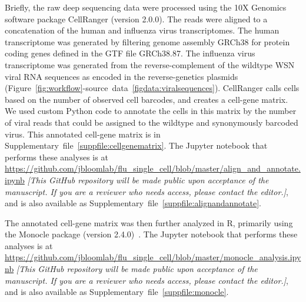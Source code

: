 \documentclass[9pt,lineno]{elife}
\newcommand{\jdbcomment}[1]{\emph{\color{red} [#1]}}
\begin{document}
Briefly, the raw deep sequencing data were processed using the 10X Genomics software package CellRanger (version 2.0.0).
The reads were aligned to a concatenation of the human and influenza virus transcriptomes.
The human transcriptome was generated by filtering genome assembly GRCh38 for protein coding genes defined in the GTF file GRCh38.87.
The influenza virus transcriptome was generated from the reverse-complement of the wildtype WSN viral RNA sequences as encoded in the reverse-genetics plasmids (Figure~\ref{fig:workflow}-source~data~\ref{figdata:viralsequences}).
CellRanger calls cells based on the number of observed cell barcodes, and creates a cell-gene matrix.
We used custom Python code to annotate the cells in this matrix by the number of viral reads that could be assigned to the wildtype and synonymously barcoded virus.
This annotated cell-gene matrix is in Supplementary~file~\ref{suppfile:cellgenematrix}.
The Jupyter notebook that performs these analyses is at \url{https://github.com/jbloomlab/flu_single_cell/blob/master/align_and_annotate.ipynb} \jdbcomment{This GitHub repository will be made public upon acceptance of the manuscript. If you are a reviewer who needs access, please contact the editor.}, and is also available as Supplementary~file~\ref{suppfile:alignandannotate}.

The annotated cell-gene matrix was then further analyzed in R, primarily using the Monocle package (version 2.4.0)~\citep{Qiu:2017dw,Trapnell:2014kg}.
The Jupyter notebook that performs these analyses is at \url{https://github.com/jbloomlab/flu_single_cell/blob/master/monocle_analysis.ipynb} \jdbcomment{This GitHub repository will be made public upon acceptance of the manuscript. If you are a reviewer who needs access, please contact the editor.}, and is also available as Supplementary~file~\ref{suppfile:monocle}.
\end{document}
